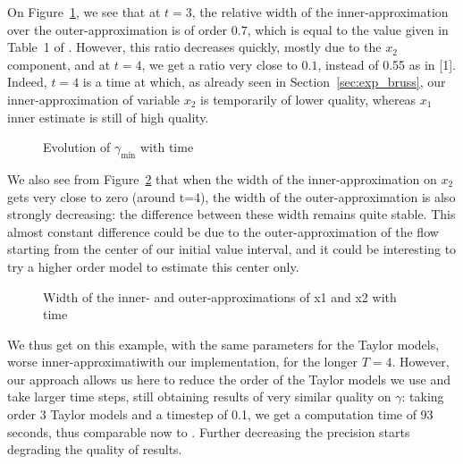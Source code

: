 

On Figure~\ref{ex:width_sriram_bruss}, we see that at $t=3$, the relative width of the inner-approximation over the
outer-approximation is of order $0.7$, which is equal to the value given in Table~1 of \cite{Underapproxflowpipes}. 
However, this ratio decreases quickly, mostly due to the $x_2$ component, and at $t=4$, we get a ratio very close to $0.1$,
instead of 0.55 as in [1]. Indeed, $t=4$ is a time at which, as already seen in Section~\ref{sec:exp_bruss}, our 
inner-approximation of variable $x_2$ is temporarily of lower quality, whereas $x_1$ inner estimate
is still of high quality.
\begin{figure}
\begin{center}
\end{center}
\caption{Evolution of $\gamma_{\min}$ with time \label{ex:width_sriram_bruss} }
\end{figure}
We also see from Figure~\ref{ex:width_sriram_bruss_x1x2} that when the width of the inner-approximation on $x_2$ gets very close 
to zero (around t=4), the width of the outer-approximation is also strongly decreasing: the difference between these width remains 
quite stable. This almost constant difference could be due to the outer-approximation of the flow starting from the center of our 
initial value interval, and it could be interesting to try a higher order model to estimate this center only.
\begin{figure}[htbp]
\caption{Width of the inner- and outer-approximations of x1 and x2 with time \label{ex:width_sriram_bruss_x1x2}}
\end{figure}
We thus get on this example, with the same parameters for the Taylor models, worse inner-approximatiwith our implementation, for the longer $T=4$.
However, our approach allows us here to reduce the order of the Taylor models we use and take larger time steps, still obtaining results of very similar quality on $\gamma$: taking order 3 
Taylor models and a timestep of 0.1, we get a computation time of 93 seconds, thus comparable now to \cite{Underapproxflowpipes}. 
Further decreasing the precision starts degrading the quality of results.    

